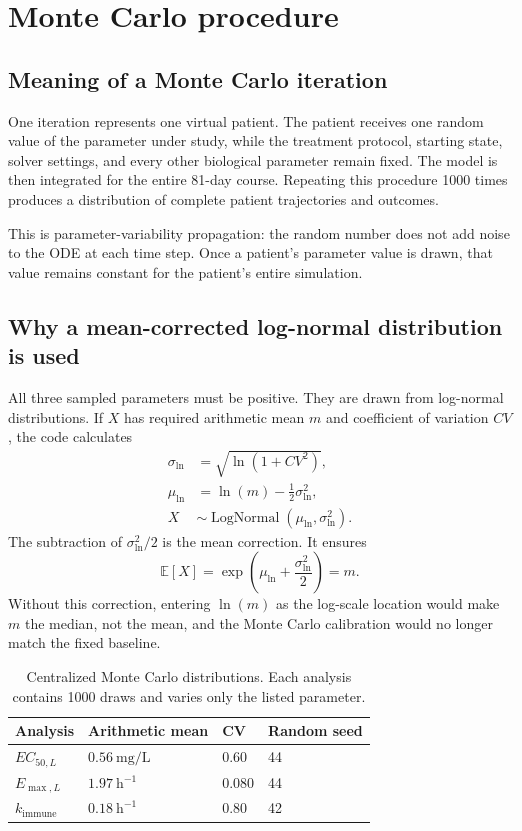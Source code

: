 \documentclass[11pt]{article}
\newcommand{\EC}{EC_{50,L}}
\newcommand{\EM}{E_{\max,L}}
\newcommand{\KI}{k_{\mathrm{immune}}}
\begin{document}
\section{Monte Carlo procedure}

\subsection{Meaning of a Monte Carlo iteration}

One iteration represents one virtual patient. The patient receives one random
value of the parameter under study, while the treatment protocol, starting
state, solver settings, and every other biological parameter remain fixed.
The model is then integrated for the entire 81-day course. Repeating this
procedure 1000 times produces a distribution of complete patient trajectories
and outcomes.

This is parameter-variability propagation: the random number does not add
noise to the ODE at each time step. Once a patient's parameter value is drawn,
that value remains constant for the patient's entire simulation.

\subsection{Why a mean-corrected log-normal distribution is used}

All three sampled parameters must be positive. They are drawn from log-normal
distributions. If $X$ has required arithmetic mean $m$ and coefficient of
variation $CV$, the code calculates
\begin{align}
\sigma_{\ln}&=\sqrt{\ln(1+CV^2)},\\
\mu_{\ln}&=\ln(m)-\frac{1}{2}\sigma_{\ln}^2,\\
X&\sim\operatorname{LogNormal}(\mu_{\ln},\sigma_{\ln}^2).
\label{eq:lognormal}
\end{align}
The subtraction of $\sigma_{\ln}^2/2$ is the mean correction. It ensures
\begin{equation}
\mathbb{E}[X]=\exp\!\left(\mu_{\ln}+\frac{\sigma_{\ln}^2}{2}\right)=m.
\end{equation}
Without this correction, entering $\ln(m)$ as the log-scale location would
make $m$ the median, not the mean, and the Monte Carlo calibration would no
longer match the fixed baseline.

\begin{table}[htbp]
\centering
\small
\begin{tabular}{@{}llll@{}}
\toprule
Analysis & Arithmetic mean & CV & Random seed \\
\midrule
$\EC$ & $0.56~\mathrm{mg/L}$ & $0.60$ & 44 \\
$\EM$ & $1.97~\mathrm{h}^{-1}$ & $0.080$ & 44 \\
$\KI$ & $0.18~\mathrm{h}^{-1}$ & $0.80$ & 42 \\
\bottomrule
\end{tabular}
\caption{Centralized Monte Carlo distributions. Each analysis contains 1000
draws and varies only the listed parameter.}
\label{tab:mc-distributions}
\end{table}
\end{document}
